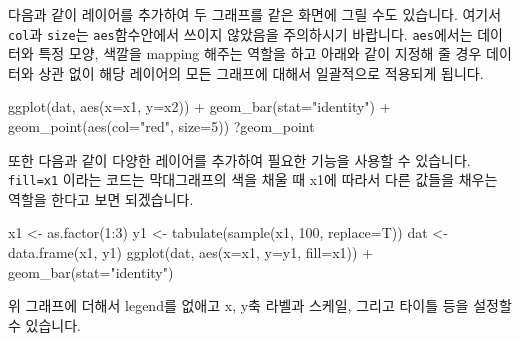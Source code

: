 \documentclass[
]{book}
\newenvironment{Shaded}{\begin{snugshade}}{\end{snugshade}}
\newcommand{\AttributeTok}[1]{\textcolor[rgb]{0.77,0.63,0.00}{#1}}
\newcommand{\DecValTok}[1]{\textcolor[rgb]{0.00,0.00,0.81}{#1}}
\newcommand{\FunctionTok}[1]{\textcolor[rgb]{0.00,0.00,0.00}{#1}}
\newcommand{\NormalTok}[1]{#1}
\newcommand{\OtherTok}[1]{\textcolor[rgb]{0.56,0.35,0.01}{#1}}
\newcommand{\SpecialCharTok}[1]{\textcolor[rgb]{0.00,0.00,0.00}{#1}}
\newcommand{\StringTok}[1]{\textcolor[rgb]{0.31,0.60,0.02}{#1}}
\begin{document}
다음과 같이 레이어를 추가하여 두 그래프를 같은 화면에 그릴 수도 있습니다. 여기서 \texttt{col}과 \texttt{size}는 \texttt{aes}함수안에서 쓰이지 않았음을 주의하시기 바랍니다. \texttt{aes}에서는 데이터와 특정 모양, 색깔을 mapping 해주는 역할을 하고 아래와 같이 지정해 줄 경우 데이터와 상관 없이 해당 레이어의 모든 그래프에 대해서 일괄적으로 적용되게 됩니다.

\begin{Shaded}
\begin{Highlighting}[]
\FunctionTok{ggplot}\NormalTok{(dat, }\FunctionTok{aes}\NormalTok{(}\AttributeTok{x=}\NormalTok{x1, }\AttributeTok{y=}\NormalTok{x2)) }\SpecialCharTok{+}
  \FunctionTok{geom\_bar}\NormalTok{(}\AttributeTok{stat=}\StringTok{"identity"}\NormalTok{) }\SpecialCharTok{+}
  \FunctionTok{geom\_point}\NormalTok{(}\FunctionTok{aes}\NormalTok{(}\AttributeTok{col=}\StringTok{"red"}\NormalTok{, }\AttributeTok{size=}\DecValTok{5}\NormalTok{))}
\NormalTok{?geom\_point}
\end{Highlighting}
\end{Shaded}

또한 다음과 같이 다양한 레이어를 추가하여 필요한 기능을 사용할 수 있습니다. \texttt{fill=x1} 이라는 코드는 막대그래프의 색을 채울 때 x1에 따라서 다른 값들을 채우는 역할을 한다고 보면 되겠습니다.

\begin{Shaded}
\begin{Highlighting}[]
\NormalTok{x1 }\OtherTok{\textless{}{-}} \FunctionTok{as.factor}\NormalTok{(}\DecValTok{1}\SpecialCharTok{:}\DecValTok{3}\NormalTok{)}
\NormalTok{y1 }\OtherTok{\textless{}{-}} \FunctionTok{tabulate}\NormalTok{(}\FunctionTok{sample}\NormalTok{(x1, }\DecValTok{100}\NormalTok{, }\AttributeTok{replace=}\NormalTok{T))}
\NormalTok{dat }\OtherTok{\textless{}{-}} \FunctionTok{data.frame}\NormalTok{(x1, y1)}
\FunctionTok{ggplot}\NormalTok{(dat, }\FunctionTok{aes}\NormalTok{(}\AttributeTok{x=}\NormalTok{x1, }\AttributeTok{y=}\NormalTok{y1, }\AttributeTok{fill=}\NormalTok{x1)) }\SpecialCharTok{+}
  \FunctionTok{geom\_bar}\NormalTok{(}\AttributeTok{stat=}\StringTok{"identity"}\NormalTok{) }
\end{Highlighting}
\end{Shaded}

위 그래프에 더해서 legend를 없애고 x, y축 라벨과 스케일, 그리고 타이틀 등을 설정할 수 있습니다.
\end{document}
